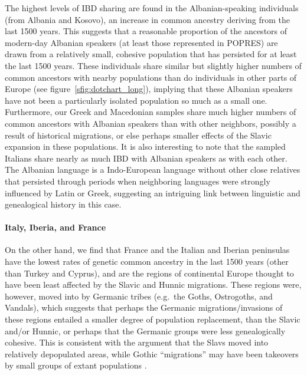 \documentclass{article}
\begin{document}
The highest levels of IBD sharing are found in the Albanian-speaking individuals (from Albania and Kosovo),
an increase in common ancestry deriving from the last 1500 years.
This suggests that a reasonable proportion of the 
ancestors of modern-day Albanian speakers (at least those represented in POPRES)
are drawn from a relatively small, cohesive population
that has persisted for at least the last 1500 years.
These individuals share similar but slightly higher numbers of common ancestors with nearby populations
than do individuals in other parts of Europe (see figure~\ref{sfig:dotchart_long}),
implying that these Albanian speakers have not been a particularly isolated population so much as a small one.
Furthermore, our Greek and Macedonian samples
share much higher numbers of common ancestors with Albanian speakers than with other neighbors,
possibly a result of historical migrations, or else perhaps smaller effects of the Slavic expansion in these populations.
It is also interesting to note that the sampled Italians share nearly as much IBD with Albanian speakers as with each other.
The Albanian language is a Indo-European language without other close relatives \citep{hamp1966position}
that persisted through periods when neighboring languages were
strongly influenced by Latin or Greek, suggesting an intriguing link
between linguistic and genealogical history in this case. 


\paragraph{Italy, Iberia, and France}
On the other hand,
we find that France and the Italian and Iberian peninsulas have the lowest rates of genetic common ancestry in the last 1500 years
(other than Turkey and Cyprus),
and are the regions of continental Europe thought to have been least affected by the Slavic and Hunnic migrations.
These regions were, however, moved into by Germanic tribes (e.g.\ the Goths, Ostrogoths, and Vandals),
which suggests that perhaps the Germanic migrations/invasions of these regions 
entailed a smaller degree of population replacement, 
than the Slavic and/or Hunnic,
or perhaps that the Germanic groups were less genealogically cohesive.
This is consistent with the argument that the Slavs moved into relatively depopulated areas,
while Gothic ``migrations'' may have been takeovers by small groups of extant populations
\citep{halsall2005barbarian,kobylinski2005slavs}.
\end{document}
